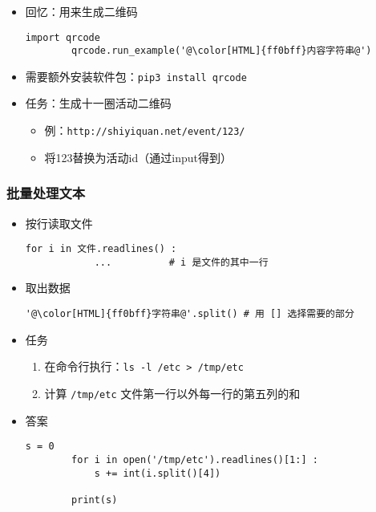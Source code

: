 \begin{CJK}{UTF8}{gbsn}
\begin{frame} [fragile]
	\frametitle{}
	\linespread{1.5}
	\begin{itemize}
	\item 回忆：用来生成二维码
		\begin{lstlisting}[style=pythonstyle, gobble=8, texcl, escapechar=@]
		import qrcode
		qrcode.run_example('@\color[HTML]{ff0bff}内容字符串@')
		\end{lstlisting}
	\item 需要额外安装软件包：\texttt{pip3 install qrcode}
	\item 任务：生成十一圈活动二维码
		\begin{itemize}
		\item 例：\texttt{http://shiyiquan.net/event/123/}
		\item 将123替换为活动id（通过input得到）
		\end{itemize}
	\end{itemize}
\end{frame}

\begin{frame} [fragile]
	\frametitle{批量处理文本}
	\linespread{1.25}
	\begin{itemize}
	\item 按行读取文件
		\begin{lstlisting}[style=pythonstyle, gobble=8, texcl]
		for i in 文件.readlines() :
			...			 # i 是文件的其中一行
		\end{lstlisting}
	\item 取出数据
		\begin{lstlisting}[style=pythonstyle, gobble=8, texcl, escapechar=@]
		'@\color[HTML]{ff0bff}字符串@'.split()	# 用 [] 选择需要的部分
		\end{lstlisting}
	\item 任务
		\begin{enumerate}
		\item 在命令行执行：\texttt{ls -l /etc > /tmp/etc}
		\item 计算 \texttt{/tmp/etc} 文件第一行以外每一行的第五列的和
		\end{enumerate}
	\item 答案
		\fontsize{2}{2}\selectfont
		\begin{lstlisting}[style=pythonstyle, gobble=8, texcl]
		s = 0
		for i in open('/tmp/etc').readlines()[1:] :
			s += int(i.split()[4])

		print(s)
		\end{lstlisting}
	\end{itemize}
\end{frame}


\end{CJK}
